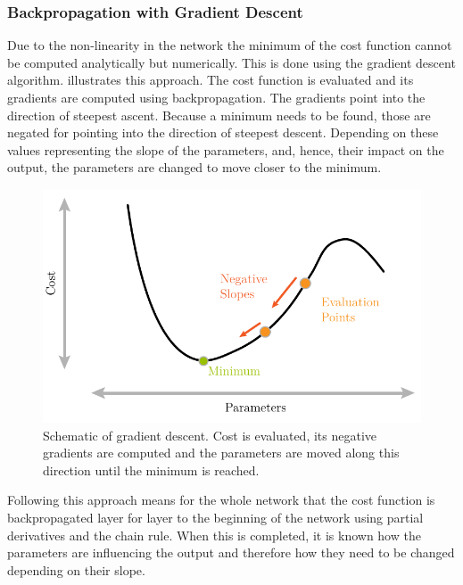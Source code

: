 \subsubsection{Backpropagation with Gradient Descent}
\label{sec:training-gradient-descent}
Due to the non-linearity in the network the minimum of the cost function cannot be computed analytically but numerically.
This is done using the gradient descent algorithm\cite{kiefer1952}\cite{robbins1951}.
 illustrates this approach.
The cost function is evaluated and its gradients are computed using backpropagation\cite{rumelhart1986learning}.
The gradients point into the direction of steepest ascent.
Because a minimum needs to be found, those are negated for pointing into the direction of steepest descent.
Depending on these values representing the slope of the parameters, and, hence, their impact on the output, the parameters are changed to move closer to the minimum.
\begin{figure}
	\centering
	\includegraphics{images/gradient_descent.pdf}
	\caption[Schematic of Gradient Descent]{Schematic of gradient descent. Cost is evaluated, its negative gradients are computed and the parameters are moved along this direction until the minimum is reached.}
	\label{fig:gradient-descent}
\end{figure}
Following this approach means for the whole network that the cost function is backpropagated layer for layer to the beginning of the network using partial derivatives and the chain rule.
When this is completed, it is known how the parameters are influencing the output and therefore how they need to be changed depending on their slope.

